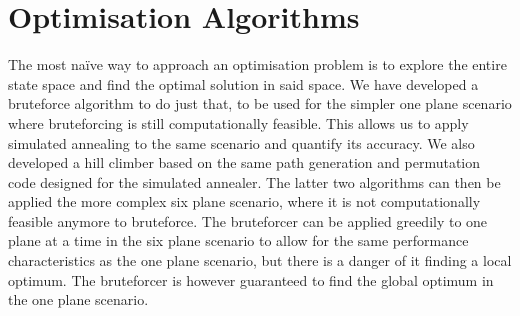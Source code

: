 \documentclass[journal]{IEEEtran}
\begin{document}
\section{Optimisation Algorithms}
The most na\"ive way to approach an optimisation problem is to explore the entire state space and find the optimal solution in said space. We have developed a bruteforce algorithm to do just that, to be used for the simpler one plane scenario where bruteforcing is still computationally feasible. This allows us to apply simulated annealing to the same scenario and quantify its accuracy. We also developed a hill climber based on the same path generation and permutation code designed for the simulated annealer. The latter two algorithms can then be applied the more complex six plane scenario, where it is not computationally feasible anymore to bruteforce. The bruteforcer can be applied greedily to one plane at a time in the six plane scenario to allow for the same performance characteristics as the one plane scenario, but there is a danger of it finding a local optimum. The bruteforcer is however guaranteed to find the global optimum in the one plane scenario.
\end{document}
